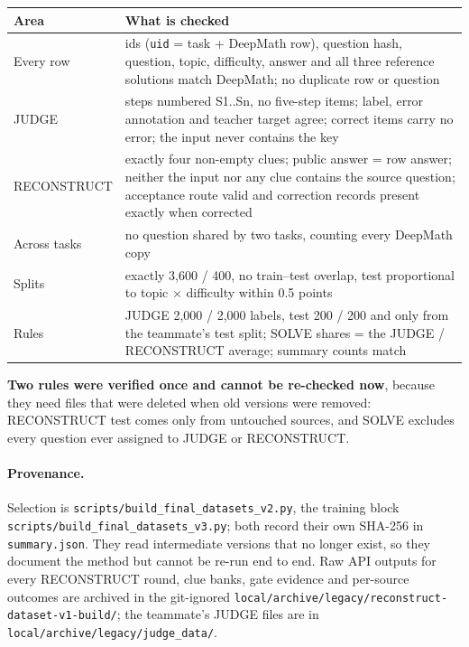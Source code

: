 \documentclass[11pt,a4paper]{article}
\newcommand{\code}[1]{\texttt{#1}}
\begin{document}
\begin{table}[H]
\centering\small
\begin{tabularx}{\textwidth}{@{}p{2.6cm}L@{}}
\toprule
Area & What is checked \\
\midrule
Every row & ids (\code{uid} = task + DeepMath row), question hash, question, topic, difficulty, answer and all three reference solutions match DeepMath; no duplicate row or question \\
JUDGE & steps numbered S1..Sn, no five-step items; label, error annotation and teacher target agree; correct items carry no error; the input never contains the key \\
RECONSTRUCT & exactly four non-empty clues; public answer = row answer; neither the input nor any clue contains the source question; acceptance route valid and correction records present exactly when corrected \\
Across tasks & no question shared by two tasks, counting every DeepMath copy \\
Splits & exactly 3,600 / 400, no train--test overlap, test proportional to topic $\times$ difficulty within 0.5 points \\
Rules & JUDGE 2,000 / 2,000 labels, test 200 / 200 and only from the teammate's test split; SOLVE shares = the JUDGE / RECONSTRUCT average; summary counts match \\
\bottomrule
\end{tabularx}
\end{table}

\textbf{Two rules were verified once and cannot be re-checked now}, because they need files that were deleted when old versions were removed: RECONSTRUCT test comes only from untouched sources, and SOLVE excludes every question ever assigned to JUDGE or RECONSTRUCT.

\paragraph{Provenance.} Selection is \nolinkurl{scripts/build_final_datasets_v2.py}, the training block \nolinkurl{scripts/build_final_datasets_v3.py}; both record their own SHA-256 in \code{summary.json}. They read intermediate versions that no longer exist, so they document the method but cannot be re-run end to end. Raw API outputs for every RECONSTRUCT round, clue banks, gate evidence and per-source outcomes are archived in the git-ignored \nolinkurl{local/archive/legacy/reconstruct-dataset-v1-build/}; the teammate's JUDGE files are in \nolinkurl{local/archive/legacy/judge_data/}.
\end{document}

